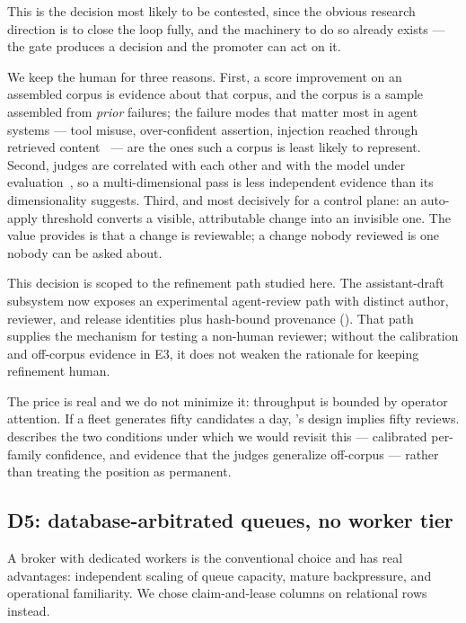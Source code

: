 This is the decision most likely to be contested, since the obvious research
direction is to close the loop fully, and the machinery to do so already exists ---
the gate produces a decision and the promoter can act on it.

We keep the human for three reasons. First, a score improvement on an assembled
corpus is evidence about that corpus, and the corpus is a sample assembled from
\emph{prior} failures; the failure modes that matter most in agent systems --- tool
misuse, over-confident assertion, injection reached through retrieved
content~\cite{greshake2023injection} --- are the ones such a corpus is least likely
to represent. Second, judges are correlated with each other and with the model under
evaluation~\cite{zheng2023judging}, so a multi-dimensional pass is less independent
evidence than its dimensionality suggests. Third, and most decisively for a control
plane: an auto-apply threshold converts a visible, attributable change into an
invisible one. The value \sys provides is that a change is reviewable; a change
nobody reviewed is one nobody can be asked about.

This decision is scoped to the refinement path studied here. The assistant-draft
subsystem now exposes an experimental agent-review path with distinct author,
reviewer, and release identities plus hash-bound provenance
(). That path supplies the mechanism for testing a
non-human reviewer; without the calibration and off-corpus evidence in E3, it does
not weaken the rationale for keeping refinement  human.

The price is real and we do not minimize it: throughput is bounded by operator
attention. If a fleet generates fifty candidates a day, \sys's design implies fifty
reviews.  describes the two conditions under which we would
revisit this --- calibrated per-family confidence, and evidence that the judges
generalize off-corpus --- rather than treating the position as permanent.

\subsection{D5: database-arbitrated queues, no worker tier}

A broker with dedicated workers is the conventional choice and has real advantages:
independent scaling of queue capacity, mature backpressure, and operational
familiarity. We chose claim-and-lease columns on relational rows instead.

